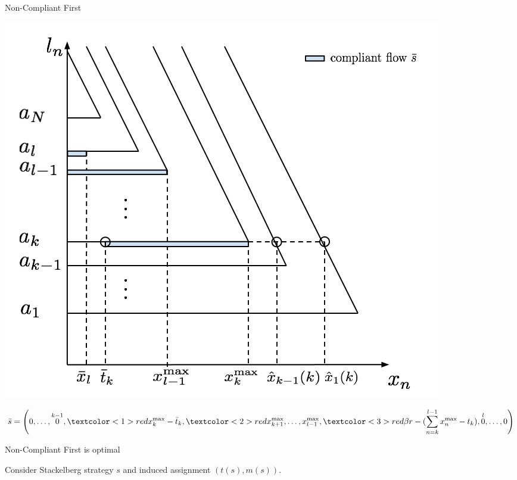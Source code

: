 \documentclass[xcolor=svgnames, english, smaller]{beamer}
\theoremstyle{plain}
\theoremstyle{definition}
\theoremstyle{plain}
\theoremstyle{plain}
\begin{document}
\begin{frame}{Non-Compliant First}

\begin{center}
\includegraphics[scale=0.25]{../../figures/presentation/optimal_stackelberg3.png}
\end{center}

\small
\begin{align*}
\bar{s} = 
\left( 
0, \dots, \overset{k-1}{0}, 
\textcolor<1>{red}{ x_k^{\max} - \bar{t}_k}, 
\textcolor<2>{red}{x_{k+1}^{\max}, \dots, x_{l-1}^{\max}}, 
\textcolor<3>{red}{\beta r - (\sum_{n = k}^{l-1}x_n^{\max} - t_k)}, 
\overset{l}{0}, \dots, 0
\right)
\end{align*}


\end{frame}



\begin{frame}{Non-Compliant First is optimal}

Consider Stackelberg strategy $s$ and induced assignment $(t(s), m(s))$.



\end{frame}
\end{document}
